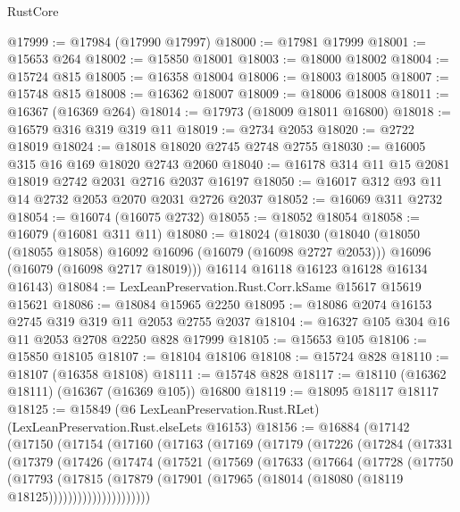 \begin{lexlean}{RustCore}
\begin{coremodule}
@17999 := @17984 (@17990 @17997)
@18000 := @17981 @17999
@18001 := @15653 @264
@18002 := @15850 @18001
@18003 := @18000 @18002
@18004 := @15724 @815
@18005 := @16358 @18004
@18006 := @18003 @18005
@18007 := @15748 @815
@18008 := @16362 @18007
@18009 := @18006 @18008
@18011 := @16367 (@16369 @264)
@18014 := @17973 (@18009 @18011 @16800)
@18018 := @16579 @316 @319 @319 @11
@18019 := @2734 @2053
@18020 := @2722 @18019
@18024 := @18018 @18020 @2745 @2748 @2755
@18030 := @16005 @315 @16 @169 @18020 @2743 @2060
@18040 := @16178 @314 @11 @15 @2081 @18019 @2742 @2031 @2716 @2037 @16197
@18050 := @16017 @312 @93 @11 @14 @2732 @2053 @2070 @2031 @2726 @2037
@18052 := @16069 @311 @2732
@18054 := @16074 (@16075 @2732)
@18055 := @18052 @18054
@18058 := @16079 (@16081 @311 @11)
@18080 := @18024
    (@18030
      (@18040
        (@18050 (@18055 @18058) @16092 @16096 (@16079 (@16098 @2727 @2053)))
        @16096
        (@16079 (@16098 @2717 @18019)))
      @16114
      @16118
      @16123
      @16128
      @16134
      @16143)
@18084 := LexLeanPreservation.Rust.Corr.kSame @15617 @15619 @15621
@18086 := @18084 @15965 @2250
@18095 := @18086 @2074 @16153 @2745 @319 @319 @11 @2053 @2755 @2037
@18104 := @16327 @105 @304 @16 @11 @2053 @2708 @2250 @828 @17999
@18105 := @15653 @105
@18106 := @15850 @18105
@18107 := @18104 @18106
@18108 := @15724 @828
@18110 := @18107 (@16358 @18108)
@18111 := @15748 @828
@18117 := @18110 (@16362 @18111) (@16367 (@16369 @105)) @16800
@18119 := @18095 @18117 @18117
@18125 := @15849 (@6 LexLeanPreservation.Rust.RLet) (LexLeanPreservation.Rust.elseLets @16153)
@18156 := @16884
    (@17142
      (@17150
        (@17154
          (@17160
            (@17163
              (@17169
                (@17179
                  (@17226
                    (@17284
                      (@17331
                        (@17379
                          (@17426
                            (@17474
                              (@17521
                                (@17569
                                  (@17633
                                    (@17664
                                      (@17728
                                        (@17750
                                          (@17793
                                            (@17815
                                              (@17879
                                                (@17901
                                                  (@17965
                                                    (@18014
                                                      (@18080 (@18119 @18125)))))))))))))))))))))

\end{coremodule}
\end{lexlean}
